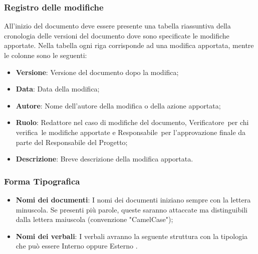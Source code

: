 \subsubsection{Registro delle modifiche}\label{Registro}
All’inizio del documento deve essere presente una tabella riassuntiva della cronologia delle versioni del documento dove sono specificate le modifiche apportate.
Nella tabella ogni riga corrisponde ad una modifica apportata, mentre le colonne sono le seguenti:
\begin{itemize}
    \item \textbf{Versione}: Versione del documento dopo la modifica;
    \item \textbf{Data}: Data della modifica;
    \item \textbf{Autore}: Nome dell’autore della modifica o della azione apportata;
    \item \textbf{Ruolo}: Redattore nel caso di modifiche del documento, Verificatore\glo\ per chi verifica\glo\ le modifiche apportate e Responsabile\glo\ per l’approvazione finale da parte del Responsabile del Progetto;
    \item \textbf{Descrizione}: Breve descrizione della modifica apportata.
\end{itemize}

\subsubsection{Forma Tipografica}
\begin{itemize}
  \item \textbf{Nomi dei documenti}: I nomi dei documenti iniziano sempre con la lettera minuscola. Se presenti più parole, queste saranno attaccate ma distinguibili dalla lettera maiuscola (convenzione "CamelCase");
  \item \textbf{Nomi dei verbali}: I verbali avranno la seguente struttura  con la tipologia che può essere Interno  oppure Esterno .
\end{itemize}

